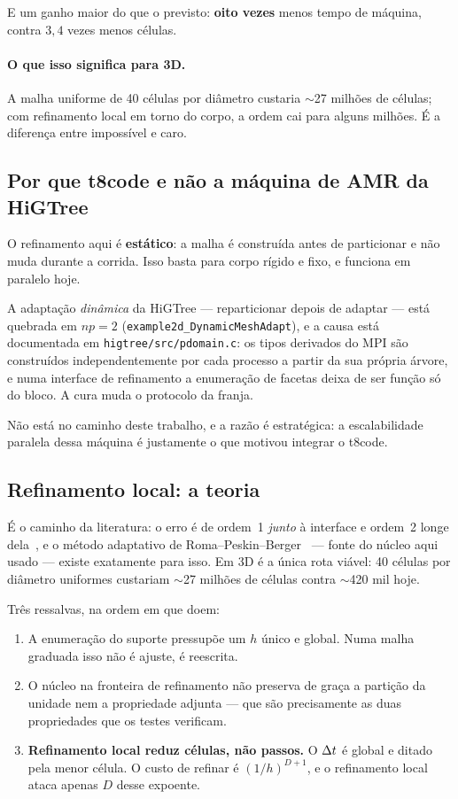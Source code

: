 E um ganho maior do que o previsto: \textbf{oito vezes} menos tempo de máquina,
contra $3{,}4$ vezes menos células.

\paragraph{O que isso significa para 3D.} A malha uniforme de 40 células por
diâmetro custaria $\sim$27 milhões de células; com refinamento local em torno do
corpo, a ordem cai para alguns milhões. É a diferença entre impossível e caro.

\subsection{Por que t8code e não a máquina de AMR da HiGTree}

O refinamento aqui é \textbf{estático}: a malha é construída antes de
particionar e não muda durante a corrida. Isso basta para corpo rígido e fixo, e
funciona em paralelo hoje.

A adaptação \emph{dinâmica} da HiGTree --- reparticionar depois de adaptar ---
está quebrada em $np=2$ (\texttt{example2d\_DynamicMeshAdapt}), e a causa está
documentada em \texttt{higtree/src/pdomain.c}: os tipos derivados do MPI são
construídos independentemente por cada processo a partir da sua própria árvore, e
numa interface de refinamento a enumeração de facetas deixa de ser função só do
bloco. A cura muda o protocolo da franja.

Não está no caminho deste trabalho, e a razão é estratégica: a escalabilidade
paralela dessa máquina é justamente o que motivou integrar o t8code.

\subsection{Refinamento local: a teoria}

É o caminho da literatura: o erro é de ordem~1 \emph{junto} à interface e ordem~2
longe dela~\cite{lai2000,griffith2005}, e o método adaptativo de
Roma--Peskin--Berger~\cite{roma1999} --- fonte do núcleo aqui usado --- existe
exatamente para isso. Em 3D é a única rota viável: 40 células por diâmetro
uniformes custariam $\sim$27 milhões de células contra $\sim$420 mil hoje.

Três ressalvas, na ordem em que doem:

\begin{enumerate}
  \item A enumeração do suporte pressupõe um $h$ único e global. Numa malha
        graduada isso não é ajuste, é reescrita.
  \item O núcleo na fronteira de refinamento não preserva de graça a partição da
        unidade nem a propriedade adjunta --- que são precisamente as duas
        propriedades que os testes verificam.
  \item \textbf{Refinamento local reduz células, não passos.} O $\Delta t$ é global e
        ditado pela menor célula. O custo de refinar é $(1/h)^{D+1}$, e o
        refinamento local ataca apenas $D$ desse expoente.
\end{enumerate}

